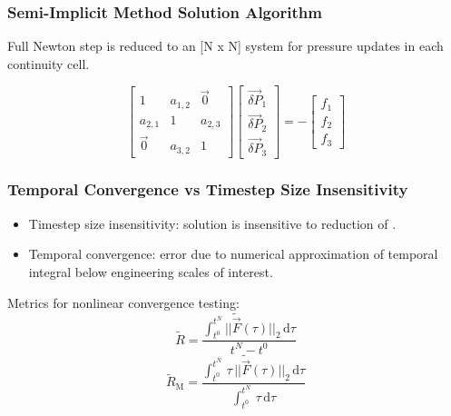 \documentclass[compress,xcolor=table]{beamer}
\begin{document}
\begin{frame}
\frametitle{Semi-Implicit Method Solution Algorithm}

Full Newton step is reduced to an [N x N] system for pressure updates in each continuity cell.

\begin{equation*}
\label{eqn:si_pressure_matrix}
\begin{bmatrix} 
 1 & a_{1,2} & \vec{0} \\
a_{2,1} & 1 & a_{2,3} \\
\vec{0}           & a_{3,2} & 1
\end{bmatrix} \begin{bmatrix}
\vec{\delta P}_{1} \\
\vec{\delta P}_{2} \\
\vec{\delta P}_{3}
\end{bmatrix}  = -\begin{bmatrix}
f_{1} \\
f_{2} \\
f_{3}
\end{bmatrix}
\end{equation*}

\end{frame}

\begin{frame}
\frametitle{Temporal Convergence vs Timestep Size Insensitivity}

\begin{itemize}
\item{Timestep size insensitivity: solution is insensitive to reduction of \dtmax{}.}
\item{Temporal convergence: error due to numerical approximation of temporal integral below engineering scales of interest.}
\end{itemize}

Metrics for nonlinear convergence testing:
\begin{equation*}
\tilde{R} = \frac{\int_{t^{0}}^{t^{N}} ||\tilde{\vec{F}}(\tau)||_2 \,\mathrm{d} \tau}{t^{N} - t^{0}}
\end{equation*}
\begin{equation*}
\tilde{R}_{\text{M}} = \frac{\int_{t^{0}}^{t^{N}} \,\tau\,||\tilde{\vec{F}}(\tau)||_2 \,\mathrm{d} \tau}{\int_{t^{0}}^{t^{N}} \,\tau \,\mathrm{d} \tau}
\end{equation*}

\end{frame}
\end{document}
